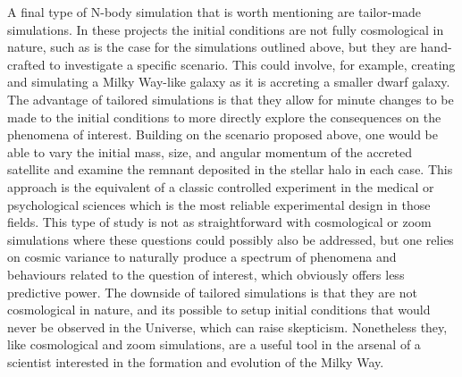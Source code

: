 A final type of N-body simulation that is worth mentioning are tailor-made simulations. In these projects the initial conditions are not fully cosmological in nature, such as is the case for the simulations outlined above, but they are hand-crafted to investigate a specific scenario. This could involve, for example, creating and simulating a Milky Way-like galaxy as it is accreting a smaller dwarf galaxy. The advantage of tailored simulations is that they allow for minute changes to be made to the initial conditions to more directly explore the consequences on the phenomena of interest. Building on the scenario proposed above, one would be able to vary the initial mass, size, and angular momentum of the accreted satellite and examine the remnant deposited in the stellar halo in each case. This approach is the equivalent of a classic controlled experiment in the medical or psychological sciences which is the most reliable experimental design in those fields. This type of study is not as straightforward with cosmological or zoom simulations where these questions could possibly also be addressed, but one relies on cosmic variance to naturally produce a spectrum of phenomena and behaviours related to the question of interest, which obviously offers less predictive power. The downside of tailored simulations is that they are not cosmological in nature, and its possible to setup initial conditions that would never be observed in the Universe, which can raise skepticism. Nonetheless they, like cosmological and zoom simulations, are a useful tool in the arsenal of a scientist interested in the formation and evolution of the Milky Way.